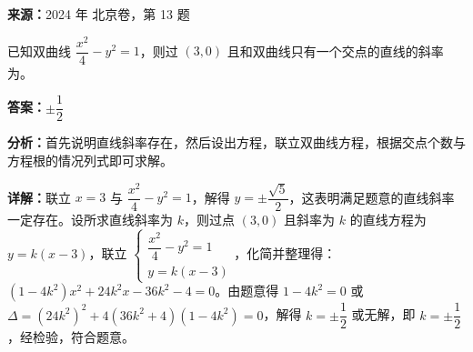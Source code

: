 \begin{question}[points=5]
\textbf{来源：}2024 年 北京卷，第 13 题\par
已知双曲线 $\dfrac{x^2}{4} - y^2 = 1$，则过 $(3,0)$ 且和双曲线只有一个交点的直线的斜率为。
\fillin[{$\pm \dfrac{1}{2}$}]
\begin{solution}
\textbf{答案：}$\pm \dfrac{1}{2}$

\textbf{分析：}首先说明直线斜率存在，然后设出方程，联立双曲线方程，根据交点个数与方程根的情况列式即可求解。

\textbf{详解：}联立 $x=3$ 与 $\dfrac{x^2}{4} - y^2 = 1$，解得 $y = \pm \dfrac{\sqrt{5}}{2}$，这表明满足题意的直线斜率一定存在。设所求直线斜率为 $k$，则过点 $(3,0)$ 且斜率为 $k$ 的直线方程为 $y = k(x-3)$，联立 $\begin{cases} \dfrac{x^2}{4} - y^2 = 1 \\ y = k(x-3) \end{cases}$，化简并整理得：$(1-4k^2)x^2 + 24k^2x - 36k^2 - 4 = 0$。由题意得 $1-4k^2 = 0$ 或 $\Delta = (24k^2)^2 + 4(36k^2+4)(1-4k^2) = 0$，解得 $k = \pm \dfrac{1}{2}$ 或无解，即 $k = \pm \dfrac{1}{2}$，经检验，符合题意。
\end{solution}
\end{question}

